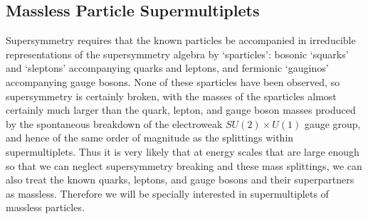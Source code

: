 
\subsection{Massless Particle Supermultiplets}

\providecommand{\WeylQ}{\mathrm{Q}}

Supersymmetry requires that the known particles be accompanied in irreducible
representations of the supersymmetry algebra by `sparticles': bosonic
`squarks' and `sleptons' accompanying quarks and leptons, and fermionic
`gauginos' accompanying gauge bosons. None of these sparticles have been
observed, so supersymmetry is certainly broken, with the masses of the
sparticles almost certainly much larger than the quark, lepton, and gauge
boson masses produced by the spontaneous breakdown of the electroweak
$SU(2)\times U(1)$ gauge group, and hence of the same order of magnitude as the
splittings within supermultiplets. Thus it is very likely that at energy
scales that are large enough so that we can neglect supersymmetry breaking and
these mass splittings, we can also treat the known quarks, leptons, and gauge
bosons and their superpartners as massless. Therefore we will be specially
interested in supermultiplets of massless particles.

